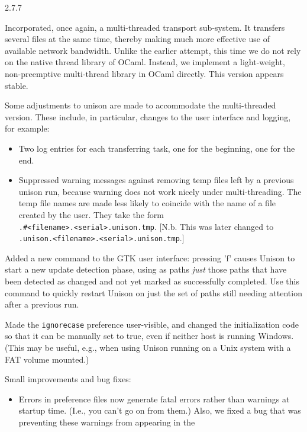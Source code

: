 \begin{changesfromversion}{2.7.7}
\item Incorporated, once again, a multi-threaded transport sub-system.
  It transfers several files at the same time, thereby making much
  more effective use of available network bandwidth.  Unlike the
  earlier attempt, this time we do not rely on the native thread
  library of OCaml.  Instead, we implement a light-weight,
  non-preemptive multi-thread library in OCaml directly.  This version
  appears stable.  

  Some adjustments to unison are made to accommodate the multi-threaded
  version.  These include, in particular, changes to the
  user interface and logging, for example:
  \begin{itemize}
  \item Two log entries for each transferring task, one for the
    beginning, one for the end.
  \item Suppressed warning messages against removing temp files left
    by a previous unison run, because warning does not work nicely
    under multi-threading.  The temp file names are made less likely
    to coincide with the name of a file created by the user.  They
    take the form \\ \verb|.#<filename>.<serial>.unison.tmp|.
    [N.b. This was later changed to \verb|.unison.<filename>.<serial>.unison.tmp|.]
  \end{itemize}
\item Added a new command to the GTK user interface: pressing 'f' causes
  Unison to start a new update detection phase, using as paths {\em just}
  those paths that have been detected as changed and not yet marked as
  successfully completed.  Use this command to quickly restart Unison on
  just the set of paths still needing attention after a previous run.
\item Made the {\tt ignorecase} preference user-visible, and changed the
  initialization code so that it can be manually set to true, even if
  neither host is running Windows.  (This may be useful, e.g., when using 
  Unison running on a Unix system with a FAT volume mounted.)
\item Small improvements and bug fixes:
  \begin{itemize}
  \item Errors in preference files now generate fatal errors rather than
    warnings at startup time.  (I.e., you can't go on from them.)  Also,
    we fixed a bug that was preventing these warnings from appearing in the

\end{itemize}
\end{changesfromversion}
